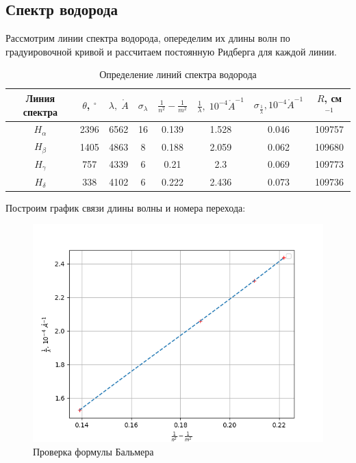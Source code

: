 \documentclass[a4paper, 12pt]{article}%
\begin{document}
\subsection{Спектр водорода}

	Рассмотрим линии спектра водорода, опеределим их длины волн по градуировочной кривой и рассчитаем постоянную Ридберга для каждой линии.
	
	\newpage
	
		\begin{table}[h!]
		\begin{center}
			\begin{tabular}{|c|c|c|c|c|c|c|c|}
				\hline 
				Линия спектра & $ \theta $, $ ^\circ $ & $ \lambda, \;\mathring{A} $ & $ \sigma_{\lambda} $ & $ \frac{1}{n^2} - \frac{1}{m^2} $ & $ \frac{1}{\lambda}, \;  10^{-4} \mathring{A}^{-1} $  &  $ \sigma_{\frac{1}{\lambda}}, 10^{-4} \mathring{A}^{-1} $ & $R$, см$^{-1}$ \\ 
			\hline $ H_\alpha $ & 2396 & 6562 & 16 & 0.139 & 1.528 & 0.046 & 109757 \\
		\hline $ H_\beta $  & 1405 & 4863 & 8 & 0.188 & 2.059 & 0.062 & 109680\\
			\hline $ H_\gamma $ & 757 & 4339 & 6 & 0.21 & 2.3 & 0.069 & 109773\\
			\hline $ H_\delta $ & 338 & 4102 & 6 & 0.222 & 2.436 & 0.073 & 109736\\
				\hline 
			\end{tabular} 
		\end{center}
		\caption{Определение линий спектра водорода}
		\label{table_mn}
	\end{table}
	
	Построим график связи длины волны и номера перехода:

	\begin{figure}[!h]
		\begin{center}
		\includegraphics[scale=0.9]{3.png}
		\end{center}		
		\caption{Проверка формулы Бальмера}
		\label{graf_mn}
	\end{figure} 
	
\end{document}
